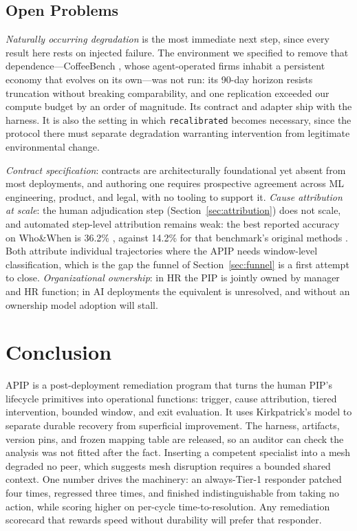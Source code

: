\documentclass[conference]{IEEEtran}
\newcommand{\code}[1]{\texttt{\small #1}}
\begin{document}
\subsection{Open Problems}
\label{sec:open}

\emph{Naturally occurring degradation} is the most immediate next step, since
every result here rests on injected failure. The environment we specified to
remove that dependence---CoffeeBench \cite{coffeebench2026}, whose
agent-operated firms inhabit a persistent economy that evolves on its own---was
not run: its 90-day horizon resists truncation without breaking comparability,
and one replication exceeded our compute budget by an order of magnitude. Its
contract and adapter ship with the harness. It is also the setting in which
\code{recalibrated} becomes necessary, since the protocol there must separate
degradation warranting intervention from legitimate environmental change.

\emph{Contract specification}: contracts
are architecturally foundational yet absent from most deployments, and
authoring one requires prospective agreement across ML engineering, product,
and legal, with no tooling to support it. \emph{Cause attribution at scale}:
the human adjudication step (Section~\ref{sec:attribution}) does not scale, and
automated step-level attribution remains weak: the best reported accuracy on
Who\&When is 36.2\% \cite{ma2025attribution}, against 14.2\% for that
benchmark's original methods \cite{zhang2025}. Both attribute individual
trajectories where the APIP needs window-level classification, which is the gap
the funnel of Section~\ref{sec:funnel} is a first attempt to close.
\emph{Organizational ownership}: in HR the PIP is jointly owned by manager and
HR function; in AI deployments the equivalent is unresolved, and without an
ownership model adoption will stall.

\section{Conclusion}

APIP is a post-deployment remediation program that turns the human PIP's
lifecycle primitives into operational functions: trigger, cause attribution,
tiered intervention, bounded window, and exit evaluation. It uses Kirkpatrick's
model to separate durable recovery from superficial improvement. The harness,
artifacts, version pins, and frozen mapping table are released, so an auditor
can check the analysis was not fitted after the fact. Inserting a competent
specialist into a mesh degraded no peer, which suggests mesh disruption requires
a bounded shared context. One number drives the machinery: an always-Tier-1
responder patched four times, regressed three times, and finished
indistinguishable from taking no action, while scoring higher on per-cycle
time-to-resolution. Any remediation scorecard that rewards speed without
durability will prefer that responder.
\end{document}
